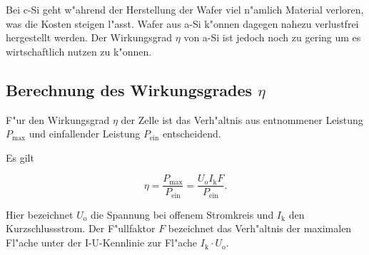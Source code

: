 		Bei c-Si geht w"ahrend der Herstellung der Wafer viel n"amlich Material verloren, was die Kosten steigen l"asst.
		Wafer aus a-Si k"onnen dagegen nahezu verlustfrei hergestellt werden.
		Der Wirkungsgrad $\eta$ von a-Si ist jedoch noch zu gering um es wirtschaftlich nutzen zu k"onnen.

	\subsection{Berechnung des Wirkungsgrades $\eta$}
		\label{subsec:wirkungsgrad}
		F"ur den Wirkungsgrad $\eta$ der Zelle ist das Verh"altnis aus entnommener Leistung $P_\mathrm{max}$ und einfallender Leistung $P_\mathrm{ein}$ entscheidend.

		Es gilt

		\begin{equation}
			\eta = \frac{P_\mathrm{max}}{P_\mathrm{ein}} = \frac{U_\mathrm{o} I_\mathrm{k} F}{P_\mathrm{ein}} .
		\end{equation}

		Hier bezeichnet $U_\mathrm{o}$ die Spannung bei offenem Stromkreis und $I_\mathrm{k}$ den Kurzschlussstrom. Der F"ullfaktor $F$ bezeichnet das Verh"altnis der maximalen Fl"ache unter der I-U-Kennlinie zur Fl"ache $I_\mathrm{k} \cdot U_\mathrm{o}$.